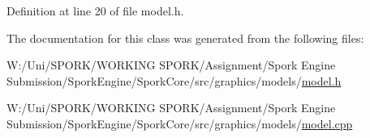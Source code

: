 Definition at line 20 of file model.\+h.



The documentation for this class was generated from the following files\+:\begin{DoxyCompactItemize}
\item 
W\+:/\+Uni/\+S\+P\+O\+R\+K/\+W\+O\+R\+K\+I\+N\+G S\+P\+O\+R\+K/\+Assignment/\+Spork Engine Submission/\+Spork\+Engine/\+Spork\+Core/src/graphics/models/\hyperlink{model_8h}{model.\+h}\item 
W\+:/\+Uni/\+S\+P\+O\+R\+K/\+W\+O\+R\+K\+I\+N\+G S\+P\+O\+R\+K/\+Assignment/\+Spork Engine Submission/\+Spork\+Engine/\+Spork\+Core/src/graphics/models/\hyperlink{model_8cpp}{model.\+cpp}\end{DoxyCompactItemize}
